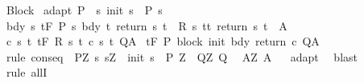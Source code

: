 \begin{isabellebody}
\isamarkupfalse%
%
\endisatagproof
{\isafoldproof}%
%
\isadelimproof
\isanewline
%
\endisadelimproof
\isanewline
{}\isamarkupfalse%
\ Block{\isacharcolon}\isanewline
{}\ adapt{\isacharcolon}\ {\isachardoublequoteopen}P\ {\isasymsubseteq}\ {\isacharbraceleft}s{\isachardot}\ init\ s\ {\isasymin}\ P{\isacharprime}\ s{\isacharbraceright}{\isachardoublequoteclose}\isanewline
{}\ bdy{\isacharcolon}\ {\isachardoublequoteopen}{\isasymforall}s{\isachardot}\ {\isasymGamma}{\isacharcomma}{\isasymTheta}{\isasymturnstile}\isactrlsub t\isactrlbsub {\isacharslash}F\isactrlesub \ {\isacharparenleft}P{\isacharprime}\ s{\isacharparenright}\ bdy\ {\isacharbraceleft}t{\isachardot}\ return\ s\ t\ {\isasymin}\ R\ s\ t{\isacharbraceright}{\isacharcomma}{\isacharbraceleft}t{\isachardot}\ return\ s\ t\ {\isasymin}\ A{\isacharbraceright}{\isachardoublequoteclose}\isanewline
{}\ c{\isacharcolon}\ {\isachardoublequoteopen}{\isasymforall}s\ t{\isachardot}\ {\isasymGamma}{\isacharcomma}{\isasymTheta}{\isasymturnstile}\isactrlsub t\isactrlbsub {\isacharslash}F\isactrlesub \ {\isacharparenleft}R\ s\ t{\isacharparenright}\ {\isacharparenleft}c\ s\ t{\isacharparenright}\ Q{\isacharcomma}A{\isachardoublequoteclose}\isanewline
{}\ {\isachardoublequoteopen}{\isasymGamma}{\isacharcomma}{\isasymTheta}{\isasymturnstile}\isactrlsub t\isactrlbsub {\isacharslash}F\isactrlesub \ P\ {\isacharparenleft}block\ init\ bdy\ return\ c{\isacharparenright}\ Q{\isacharcomma}A{\isachardoublequoteclose}\ \isanewline
%
\isadelimproof
%
\endisadelimproof
%
\isatagproof
{}\isamarkupfalse%
\ {\isacharparenleft}rule\ conseq\ {\isacharbrackleft}\ P{\isacharprime}{\isacharequal}{\isachardoublequoteopen}{\isasymlambda}Z{\isachardot}\ {\isacharbraceleft}s{\isachardot}\ s{\isacharequal}Z\ {\isasymand}\ init\ s\ {\isasymin}\ P{\isacharprime}\ Z{\isacharbraceright}{\isachardoublequoteclose}\ \ Q{\isacharprime}{\isacharequal}{\isachardoublequoteopen}{\isasymlambda}Z{\isachardot}\ Q{\isachardoublequoteclose}\ \ \isanewline
A{\isacharprime}{\isacharequal}{\isachardoublequoteopen}{\isasymlambda}Z{\isachardot}\ A{\isachardoublequoteclose}{\isacharbrackright}{\isacharparenright}\isanewline
{}\isamarkupfalse%
\ {}\isanewline
{}\isamarkupfalse%
\ adapt\isanewline
{}\isamarkupfalse%
\ \ blast\isanewline
{}\isamarkupfalse%
\ {\isacharparenleft}rule\ allI{\isacharparenright}\isanewline
{}\isamarkupfalse%

\end{isabellebody}

